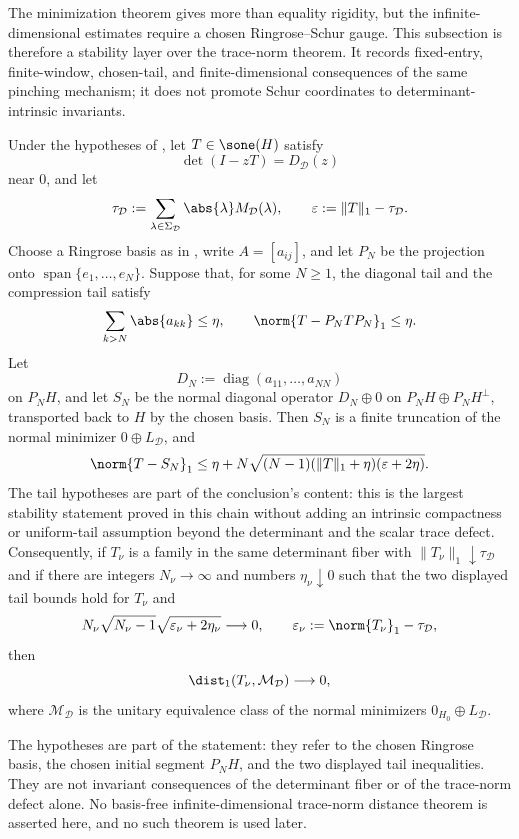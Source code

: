 The minimization theorem gives more than equality rigidity, but the
infinite-dimensional estimates require a chosen Ringrose--Schur gauge.  This
subsection is therefore a stability layer over the trace-norm theorem.  It
records fixed-entry, finite-window, chosen-tail, and finite-dimensional
consequences of the same pinching mechanism; it does not promote Schur
coordinates to determinant-intrinsic invariants.

\begin{theorem}
  \label{thm:tail-controlled-trace-distance}
  Under the hypotheses of
  , let \(T\in\sone(H)\)
  satisfy
  \[
    \det(I-zT)=D_{\mathcal D}(z)
  \]
  near \(0\), and let
  \[
    \tau_{\mathcal D}
    :=\sum_{\lambda\in\Sigma_{\mathcal D}}
      \abs{\lambda}M_{\mathcal D}(\lambda),\qquad
    \varepsilon:=\|T\|_1-\tau_{\mathcal D}.
  \]
  Choose a Ringrose basis as in
  , write
  \(A=[a_{ij}]\), and let \(P_N\) be the projection onto
  \(\operatorname{span}\{e_1,\ldots,e_N\}\). Suppose that, for some
  \(N\ge1\), the diagonal tail and the compression tail satisfy
  \[
    \sum_{k>N}\abs{a_{kk}}\le \eta,
    \qquad
    \norm{T-P_NTP_N}_1\le \eta .
  \]
  Let
  \[
    D_N:=\operatorname{diag}(a_{11},\ldots,a_{NN})
  \]
  on \(P_NH\), and let \(S_N\) be the normal diagonal operator
  \(D_N\oplus0\) on \(P_NH\oplus P_NH^\perp\), transported back to \(H\)
  by the chosen basis. Then \(S_N\) is a finite truncation of the normal
  minimizer \(0\oplus L_{\mathcal D}\), and
  \[
    \norm{T-S_N}_1
    \le
    \eta+
    N\sqrt{(N-1)(\|T\|_1+\eta)(\varepsilon+2\eta)} .
  \]
  The tail hypotheses are part of the conclusion's content: this is the
  largest stability statement proved in this chain without adding an intrinsic
  compactness or uniform-tail assumption beyond the determinant and the scalar
  trace defect.
  Consequently, if \(T_\nu\) is a family in the same determinant fiber
  with \(\|T_\nu\|_1\downarrow\tau_{\mathcal D}\) and if there are
  integers \(N_\nu\to\infty\) and numbers \(\eta_\nu\downarrow0\) such
  that the two displayed tail bounds hold for \(T_\nu\) and
  \[
    N_\nu\sqrt{N_\nu-1}\sqrt{\varepsilon_\nu+2\eta_\nu}
    \longrightarrow0,
    \qquad
    \varepsilon_\nu:=\norm{T_\nu}_1-\tau_{\mathcal D},
  \]
  then
  \[
    \dist_1(T_\nu,\mathcal M_{\mathcal D})
    \longrightarrow0,
  \]
  where \(\mathcal M_{\mathcal D}\) is the unitary equivalence class of
  the normal minimizers \(0_{H_0}\oplus L_{\mathcal D}\).

  The hypotheses are part of the statement: they refer to the chosen
  Ringrose basis, the chosen initial segment \(P_NH\), and the two
  displayed tail inequalities. They are not invariant consequences of the
  determinant fiber or of the trace-norm defect alone. No basis-free
  infinite-dimensional trace-norm distance theorem is asserted here, and no
  such theorem is used later.
\end{theorem}

